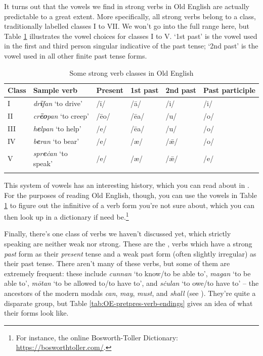 It turns out that the vowels we find in strong verbs in Old English are actually predictable to a great extent. More specifically, all strong verbs belong to a class, traditionally labelled classes I to VII. We won't go into the full range here, but Table \ref{tab:OE-strong-classes} illustrates the vowel choices for classes I to V. `1st past' is the vowel used in the first and third person singular indicative of the past tense; `2nd past' is the vowel used in all other finite past tense forms.

\begin{table}
    \centering
    \begin{tabular}{llllll}
\lsptoprule
 Class & Sample verb & Present & 1st past & 2nd past & Past participle \\
    \midrule
    I & \emph{dr\textbf{ī}fan} `to drive' & /ī/ & /ā/ & /i/ & /i/ \\
    II & \emph{cr\textbf{ēo}pan} `to creep' & /ēo/ & /ēa/ & /u/ & /o/ \\
    III & \emph{h\textbf{e}lpan} `to help' & /e/ & /ēa/ & /u/ & /o/ \\
    IV & \emph{b\textbf{e}ran} `to bear' & /e/ & /æ/ & /ǣ/ & /o/ \\
    V & \emph{spr\textbf{e}ċan} `to speak' & /e/ & /æ/ & /ǣ/ & /e/ \\
    \lspbottomrule
    \end{tabular}
    \caption{Some strong verb classes in Old English}
    \label{tab:OE-strong-classes}
\end{table}

\noindent This system of vowels has an interesting history, which you can read about in . For the purposes of reading Old English, though, you can use the vowels in Table \ref{tab:OE-strong-classes} to figure out the infinitive of a verb form you're not sure about, which you can then look up in a dictionary if need be.\footnote{For instance, the online Bosworth-Toller Dictionary: \url{https://bosworthtoller.com/}.}

Finally, there's one class of verbs we haven't discussed yet, which strictly speaking are neither weak nor strong. These are the , verbs which have a strong \emph{past} form as their \emph{present} tense and a weak past form (often slightly irregular) as their past tense. There aren't many of these verbs, but some of them are extremely frequent: these include \emph{cunnan} `to know/to be able to', \emph{magan} `to be able to', \emph{mōtan} `to be allowed to/to have to', and \emph{sċulan} `to owe/to have to' -- the ancestors of the modern modals \emph{can}, \emph{may}, \emph{must}, and \emph{shall} (see ). They're quite a disparate group, but Table \ref{tab:OE-pretpres-verb-endings} gives an idea of what their forms look like.

